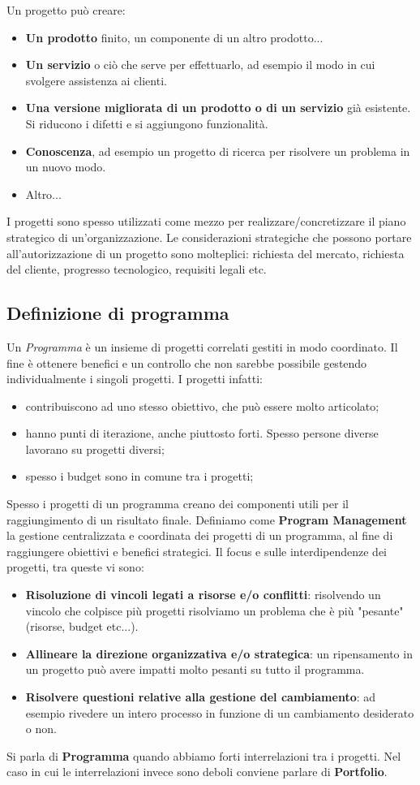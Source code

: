 Un progetto può creare:
\begin{itemize}
	\item \textbf{Un prodotto} finito, un componente di un altro prodotto...
	\item \textbf{Un servizio} o ciò che serve per effettuarlo, ad esempio il modo in cui svolgere assistenza ai clienti.
	\item \textbf{Una versione migliorata di un prodotto o di un servizio} già esistente. Si riducono i difetti e si aggiungono funzionalità.
	\item \textbf{Conoscenza}, ad esempio un progetto di ricerca per risolvere un problema in un nuovo modo.
	\item Altro...
\end{itemize}
I progetti sono spesso utilizzati come mezzo per realizzare/concretizzare il piano strategico di un'organizzazione. Le considerazioni strategiche che possono portare all'autorizzazione di un progetto sono molteplici: richiesta del mercato, richiesta del cliente, progresso tecnologico, requisiti legali etc.
\subsection{Definizione di programma}
Un \textit{Programma} è un insieme di progetti correlati gestiti in modo coordinato. Il fine è ottenere benefici e un controllo che non sarebbe possibile gestendo individualmente i singoli progetti.\newline
I progetti infatti:
\begin{itemize}
	\item contribuiscono ad uno stesso obiettivo, che può essere molto articolato;
	\item hanno punti di iterazione, anche piuttosto forti. Spesso persone diverse lavorano su progetti diversi;
	\item spesso i budget sono in comune tra i progetti;
\end{itemize}
Spesso i progetti di un programma creano dei componenti utili per il raggiungimento di un risultato finale.\newline
Definiamo come \textbf{Program Management} la gestione centralizzata e coordinata dei progetti di un programma, al fine di raggiungere obiettivi e benefici strategici. Il focus e sulle interdipendenze dei progetti, tra queste vi sono:
\begin{itemize}
	\item \textbf{Risoluzione di vincoli legati a risorse e/o conflitti}: risolvendo un vincolo che colpisce più progetti risolviamo un problema che è più "pesante" (risorse, budget etc...).
	\item \textbf{Allineare la direzione organizzativa e/o strategica}: un ripensamento in un progetto può avere impatti molto pesanti su tutto il programma.
	\item \textbf{Risolvere questioni relative alla gestione del cambiamento}: ad esempio rivedere un intero processo in funzione di un cambiamento desiderato o non.
\end{itemize}
Si parla di \textbf{Programma} quando abbiamo forti interrelazioni tra i progetti. Nel caso in cui le interrelazioni invece sono deboli conviene parlare di \textbf{Portfolio}.
